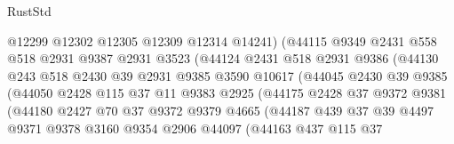 \begin{lexlean}{RustStd}
\begin{coremodule}
                          @12299
                          @12302
                          @12305
                          @12309
                          @12314
                          @14241)
                        (@44115
                          @9349
                          @2431
                          @558
                          @518
                          @2931
                          @9387
                          @2931
                          @3523
                          (@44124
                            @2431
                            @518
                            @2931
                            @9386
                            (@44130
                              @243
                              @518
                              @2430
                              @39
                              @2931
                              @9385
                              @3590
                              @10617
                              (@44045
                                @2430
                                @39
                                @9385
                                (@44050
                                  @2428
                                  @115
                                  @37
                                  @11
                                  @9383
                                  @2925
                                  (@44175
                                    @2428
                                    @37
                                    @9372
                                    @9381
                                    (@44180
                                      @2427
                                      @70
                                      @37
                                      @9372
                                      @9379
                                      @4665
                                      (@44187
                                        @439
                                        @37
                                        @39
                                        @4497
                                        @9371
                                        @9378
                                        @3160
                                        @9354
                                        @2906
                                        @44097
                                        (@44163
                                          @437
                                          @115
                                          @37

\end{coremodule}
\end{lexlean}
